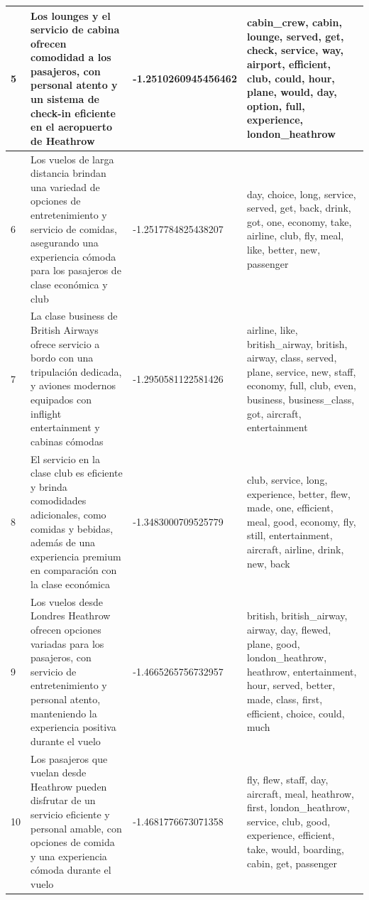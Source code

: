 \documentclass{report}
\begin{document}
{{\begin{longtable}{|p{1cm}|p{4cm}|p{4cm}|p{6cm}|}
                    \hline
                    5 & Los lounges y el servicio de cabina ofrecen comodidad a los pasajeros, con personal atento y un sistema de check-in eficiente en el aeropuerto de Heathrow & -1.2510260945456462 & cabin\_crew, cabin, lounge, served, get, check, service, way, airport, efficient, club, could, hour, plane, would, day, option, full, experience, london\_heathrow \\
                    \hline
                    6 & Los vuelos de larga distancia brindan una variedad de opciones de entretenimiento y servicio de comidas, asegurando una experiencia cómoda para los pasajeros de clase económica y club & -1.2517784825438207 & day, choice, long, service, served, get, back, drink, got, one, economy, take, airline, club, fly, meal, like, better, new, passenger \\
                    \hline
                    7 & La clase business de British Airways ofrece servicio a bordo con una tripulación dedicada, y aviones modernos equipados con inflight entertainment y cabinas cómodas & -1.2950581122581426 & airline, like, british\_airway, british, airway, class, served, plane, service, new, staff, economy, full, club, even, business, business\_class, got, aircraft, entertainment \\
                    \hline
                    8 & El servicio en la clase club es eficiente y brinda comodidades adicionales, como comidas y bebidas, además de una experiencia premium en comparación con la clase económica & -1.3483000709525779 & club, service, long, experience, better, flew, made, one, efficient, meal, good, economy, fly, still, entertainment, aircraft, airline, drink, new, back \\
                    \hline
                    9 & Los vuelos desde Londres Heathrow ofrecen opciones variadas para los pasajeros, con servicio de entretenimiento y personal atento, manteniendo la experiencia positiva durante el vuelo & -1.4665265756732957 & british, british\_airway, airway, day, flewed, plane, good, london\_heathrow, heathrow, entertainment, hour, served, better, made, class, first, efficient, choice, could, much \\
                    \hline
                    10 & Los pasajeros que vuelan desde Heathrow pueden disfrutar de un servicio eficiente y personal amable, con opciones de comida y una experiencia cómoda durante el vuelo & -1.4681776673071358 & fly, flew, staff, day, aircraft, meal, heathrow, first, london\_heathrow, service, club, good, experience, efficient, take, would, boarding, cabin, get, passenger \\

\end{longtable}}}
\end{document}
